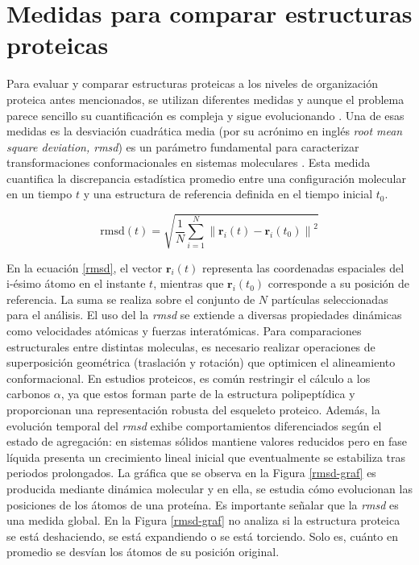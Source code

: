 \section{Medidas para comparar estructuras proteicas}

Para evaluar y comparar estructuras proteicas a los niveles de organización proteica antes mencionados, se utilizan diferentes medidas y aunque el problema parece sencillo su cuantiﬁcaci\'{o}n es compleja y sigue evolucionando \cite{Kufareva2012}. Una de esas medidas es la desviaci\'{o}n cuadr\'{a}tica media (por su acrónimo en inglés \textit{root mean square deviation, rmsd}) es un par\'{a}metro fundamental para caracterizar transformaciones conformacionales en sistemas moleculares \cite{Santamaria2023}. Esta medida cuantifica la discrepancia estad\'{i}stica promedio entre una configuraci\'{o}n molecular en un tiempo $t$ y una estructura de referencia definida en el tiempo inicial $t_0$.

\begin{equation}
	\text{rmsd}(t) = \sqrt{ \frac{1}{N} \sum_{i=1}^{N} \left\| \mathbf{r}_i(t) - \mathbf{r}_i(t_0) \right\|^2 }
	\label{rmsd}
\end{equation}

En la ecuaci\'{o}n \ref{rmsd}, el vector \(\mathbf{r}_i(t)\) representa las coordenadas espaciales del i-\'{e}simo \'{a}tomo en el instante $t$, mientras que \(\mathbf{r}_i(t_0)\) corresponde a su posici\'{o}n de referencia. La suma se realiza sobre el conjunto de $N$ part\'{i}culas seleccionadas para el an\'{a}lisis. El uso del la \textit{rmsd} se extiende a diversas propiedades din\'{a}micas como velocidades at\'{o}micas y fuerzas interat\'{o}micas. Para comparaciones estructurales entre distintas moleculas, es necesario realizar operaciones de superposici\'{o}n geom\'{e}trica (traslaci\'{o}n y rotaci\'{o}n) que optimicen el alineamiento conformacional. En estudios proteicos, es com\'{u}n restringir el c\'{a}lculo a los carbonos $\alpha$, ya que estos forman parte de la estructura polipept\'{i}dica y proporcionan una representaci\'{o}n robusta del esqueleto proteico. Además, la evoluci\'{o}n temporal del \textit{rmsd} exhibe comportamientos diferenciados seg\'{u}n el estado de agregaci\'{o}n: en sistemas s\'{o}lidos mantiene valores reducidos pero en fase l\'{i}quida presenta un crecimiento lineal inicial que eventualmente se estabiliza tras periodos prolongados. La gr\'{a}ﬁca que se observa en la Figura \ref{rmsd-graf} es producida mediante din\'{a}mica molecular y en ella, se estudia c\'{o}mo evolucionan las posiciones de los \'{a}tomos de una prote\'{i}na. Es importante señalar que la \textit{rmsd} es una medida  global. En la Figura \ref{rmsd-graf} no analiza si la estructura proteica se est\'{a} deshaciendo, se est\'{a} expandiendo o se est\'{a} torciendo. Solo es, cu\'{a}nto en promedio se desv\'{i}an los \'{a}tomos de su posici\'{o}n original.

